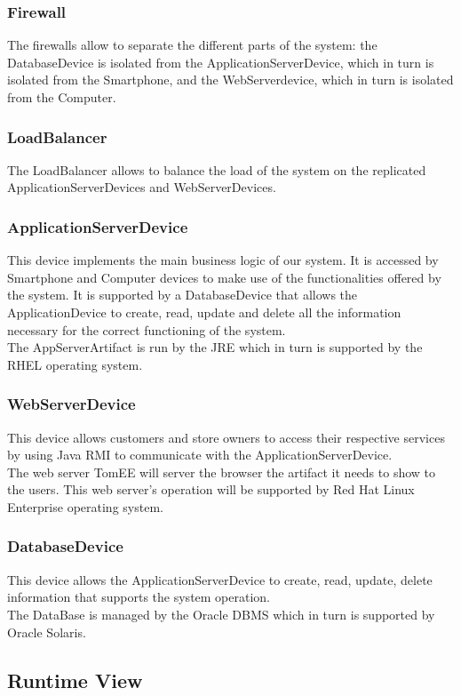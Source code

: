 \subsubsection{Firewall}
The firewalls allow to separate the different parts of the system: the DatabaseDevice is isolated from the ApplicationServerDevice, which in turn is isolated from the Smartphone, and the WebServerdevice, which in turn is isolated from the Computer.
\subsubsection{LoadBalancer}
The LoadBalancer allows to balance the load of the system on the replicated ApplicationServerDevices and WebServerDevices.
\subsubsection{ApplicationServerDevice}
This device implements the main business logic of our system. It is accessed by Smartphone and Computer devices to make use of the functionalities offered by the system. It is supported by a DatabaseDevice that allows the ApplicationDevice to create, read, update and delete all the information necessary for the correct functioning of the system.\\
The AppServerArtifact is run by the JRE which in turn is supported by the RHEL operating system.
\subsubsection{WebServerDevice}
This device allows customers and store owners to access their respective services by using Java RMI to communicate with the ApplicationServerDevice.\\
The web server TomEE will server the browser the artifact it needs to show to the users. This web server's operation will be supported by Red Hat Linux Enterprise operating system.
\subsubsection{DatabaseDevice}
This device allows the ApplicationServerDevice to create, read, update, delete information that supports the system operation.\\
The DataBase is managed by the Oracle DBMS which in turn is supported by Oracle Solaris.\newpage
\subsection{Runtime View}
